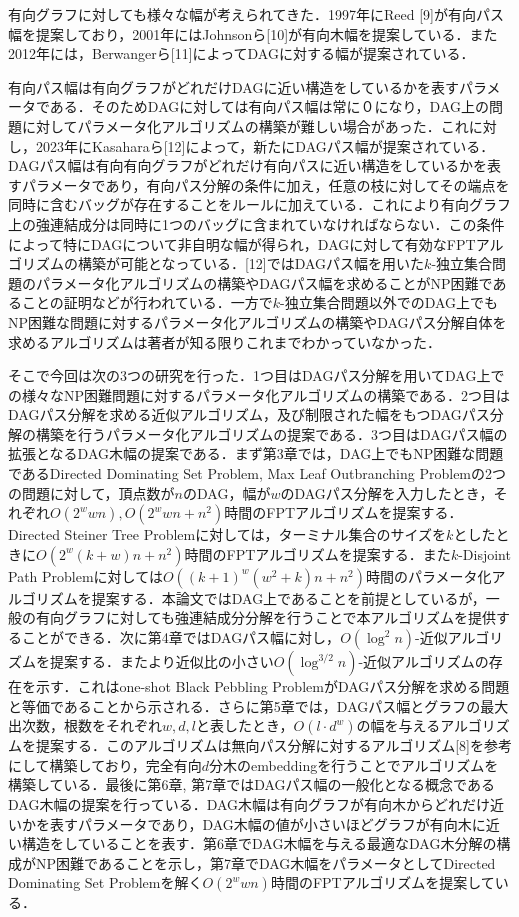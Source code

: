 \documentclass[master]{kuisthesis}		%
\theoremstyle{plain}
\theoremstyle{definition}
\begin{document}
有向グラフに対しても様々な幅が考えられてきた．1997年にReed [9]が有向パス幅を提案しており，2001年にはJohnsonら[10]が有向木幅を提案している．また2012年には，Berwangerら[11]によってDAGに対する幅が提案されている．

有向パス幅は有向グラフがどれだけDAGに近い構造をしているかを表すパラメータである．そのためDAGに対しては有向パス幅は常に０になり，DAG上の問題に対してパラメータ化アルゴリズムの構築が難しい場合があった．これに対し，2023年にKasaharaら[12]によって，新たにDAGパス幅が提案されている．DAGパス幅は有向有向グラフがどれだけ有向パスに近い構造をしているかを表すパラメータであり，有向パス分解の条件に加え，任意の枝に対してその端点を同時に含むバッグが存在することをルールに加えている．これにより有向グラフ上の強連結成分は同時に1つのバッグに含まれていなければならない．この条件によって特にDAGについて非自明な幅が得られ，DAGに対して有効なFPTアルゴリズムの構築が可能となっている．[12]ではDAGパス幅を用いた$k$-独立集合問題のパラメータ化アルゴリズムの構築やDAGパス幅を求めることがNP困難であることの証明などが行われている．一方で$k$-独立集合問題以外でのDAG上でもNP困難な問題に対するパラメータ化アルゴリズムの構築やDAGパス分解自体を求めるアルゴリズムは著者が知る限りこれまでわかっていなかった．


そこで今回は次の3つの研究を行った．1つ目はDAGパス分解を用いてDAG上での様々なNP困難問題に対するパラメータ化アルゴリズムの構築である．2つ目はDAGパス分解を求める近似アルゴリズム，及び制限された幅をもつDAGパス分解の構築を行うパラメータ化アルゴリズムの提案である．3つ目はDAGパス幅の拡張となるDAG木幅の提案である．まず第3章では，DAG上でもNP困難な問題であるDirected Dominating Set Problem, Max Leaf Outbranching Problemの2つの問題に対して，頂点数が$n$のDAG，幅が$w$のDAGパス分解を入力したとき，それぞれ$O(2^wwn), O(2^wwn+n^2)$時間のFPTアルゴリズムを提案する．Directed Steiner Tree Problemに対しては，ターミナル集合のサイズを$k$としたときに$O(2^w(k+w)n+n^2)$時間のFPTアルゴリズムを提案する．また$k$-Disjoint Path Problemに対しては$O((k+1)^w(w^2+k)n+n^2)$時間のパラメータ化アルゴリズムを提案する．本論文ではDAG上であることを前提としているが，一般の有向グラフに対しても強連結成分分解を行うことで本アルゴリズムを提供することができる．次に第4章ではDAGパス幅に対し，$O(\log^2 n)$-近似アルゴリズムを提案する．またより近似比の小さい$O(\log^{3/2} n)$-近似アルゴリズムの存在を示す．これはone-shot Black Pebbling ProblemがDAGパス分解を求める問題と等価であることから示される．さらに第5章では，DAGパス幅とグラフの最大出次数，根数をそれぞれ$w, d, l$と表したとき，$O(l\cdot d^w)$の幅を与えるアルゴリズムを提案する．このアルゴリズムは無向パス分解に対するアルゴリズム[8]を参考にして構築しており，完全有向$d$分木のembeddingを行うことでアルゴリズムを構築している．最後に第6章, 第7章ではDAGパス幅の一般化となる概念であるDAG木幅の提案を行っている．DAG木幅は有向グラフが有向木からどれだけ近いかを表すパラメータであり，DAG木幅の値が小さいほどグラフが有向木に近い構造をしていることを表す．第6章でDAG木幅を与える最適なDAG木分解の構成がNP困難であることを示し，第7章でDAG木幅をパラメータとしてDirected Dominating Set Problemを解く$O(2^wwn)$時間のFPTアルゴリズムを提案している．
\end{document}

